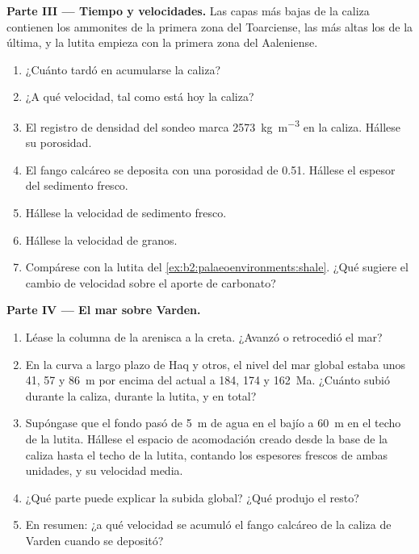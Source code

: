 \begin{problem}
\medskip\noindent\textbf{Parte III --- Tiempo y velocidades.} Las capas más bajas de la caliza contienen los
ammonites de la primera zona del Toarciense, las más altas los de la última, y la lutita empieza con
la primera zona del Aaleniense.
\begin{enumerate}[resume]
  \item ¿Cuánto tardó en acumularse la caliza?
  \item ¿A qué velocidad, tal como está hoy la caliza?
  \item El registro de densidad del sondeo marca \qty{2573}{kg.m^{-3}} en la caliza. Hállese su
        porosidad.
  \item El fango calcáreo se deposita con una porosidad de 0.51. Hállese el espesor del sedimento fresco.
  \item Hállese la velocidad de sedimento fresco.
  \item Hállese la velocidad de granos.
  \item Compárese con la lutita del \cref{ex:b2:palaeoenvironments:shale}. ¿Qué sugiere el cambio de
        velocidad sobre el aporte de carbonato?
\end{enumerate}

\medskip\noindent\textbf{Parte IV --- El mar sobre Varden.}
\begin{enumerate}[resume]
  \item Léase la columna de la arenisca a la creta. ¿Avanzó o retrocedió el mar?
  \item En la curva a largo plazo de Haq y otros, el nivel del mar global estaba unos 41, 57 y
        \qty{86}{m} por encima del actual a 184, 174 y \qty{162}{Ma}. ¿Cuánto subió durante la
        caliza, durante la lutita, y en total?
  \item Supóngase que el fondo pasó de \qty{5}{m} de agua en el bajío a \qty{60}{m} en el techo de
        la lutita. Hállese el espacio de acomodación creado desde la base de la caliza hasta el techo de la
        lutita, contando los espesores frescos de ambas unidades, y su velocidad media.
  \item ¿Qué parte puede explicar la subida global? ¿Qué produjo el resto?
  \item En resumen: ¿a qué velocidad se acumuló el fango calcáreo de la caliza de Varden cuando se
        depositó?
\end{enumerate}
\end{problem}
